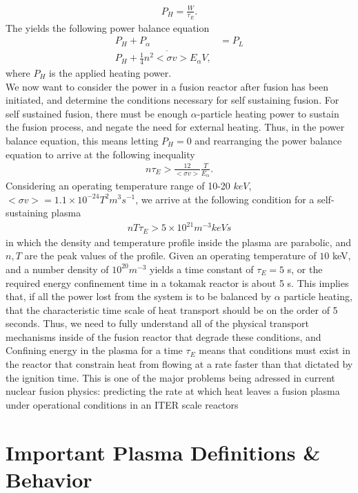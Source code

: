 \documentclass{article}
\begin{document}
\begin{align*}
P_H = \frac{W}{\tau_E}.
\end{align*}
The yields the following power balance equation
\begin{align*}
P_H + P_{\alpha} &= P_L\\
P_H + \frac{1}{4}\overline{n^2 <\sigma v>}E_{\alpha} V,
\end{align*}
where $P_H$ is the applied heating power.\\
We now want to consider the power in a fusion reactor after fusion has been initiated, and determine the conditions necessary for self sustaining fusion. For self sustained fusion,  there must be enough $\alpha$-particle heating power to sustain the fusion process, and negate the need for external heating. Thus, in the power balance equation, this means letting $P_H =0$ and rearranging the power balance equation to arrive at the following inequality
\begin{align*}
n\tau_E > \frac{12}{<\sigma v>}\frac{T}{E_\alpha}. 
\end{align*}
Considering an operating temperature range of 10-20 $keV$, $<\sigma v> = 1.1 \times 10^{-24} T^2 m^3 s^{-1}$, we arrive at the following condition for a self-sustaining plasma
\begin{align*}
nT \tau_E > 5 \times 10^{21} m^{-3} keV s
\end{align*} 
in which the density and temperature profile inside the plasma are parabolic, and $n,T$ are the peak values of the profile. Given an operating temperature of $10$ keV, and a number density of $10^20 m^{-3}$ yields a time constant of $\tau_E =5$ s, or the required energy confinement time in a tokamak reactor is about 5 s. This implies that, if all the power lost from the system is to be balanced by $\alpha$ particle heating, that the characteristic time scale of heat transport should be on the order of 5 seconds. Thus, we need to fully understand all of the physical transport mechanisms inside of the fusion reactor that degrade these conditions, and \\
Confining energy in the plasma for a time $\tau_E$ means that conditions must exist in the reactor that constrain heat from flowing at a rate faster than that dictated by the ignition time. This is one of the major problems being adressed in current nuclear fusion physics: predicting the rate at which heat leaves a fusion plasma under operational conditions in an ITER scale reactors


\section{Important Plasma Definitions \& Behavior}
\end{document}
